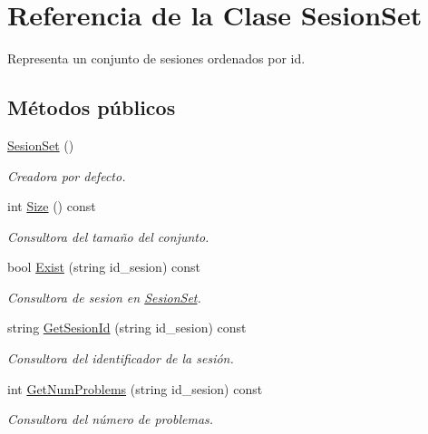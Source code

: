 \hypertarget{class_sesion_set}{}\section{Referencia de la Clase Sesion\+Set}
\label{class_sesion_set}


Representa un conjunto de sesiones ordenados por id.  


\subsection*{Métodos públicos}
\begin{DoxyCompactItemize}
\item 
\mbox{\hyperlink{class_sesion_set_af583057121150fb193e71ae02e036bb0}{Sesion\+Set}} ()
\begin{DoxyCompactList}\small\item\em Creadora por defecto. \end{DoxyCompactList}\item 
int \mbox{\hyperlink{class_sesion_set_aa4cf0fbea2b9f9b6322390fc8b4a1b4c}{Size}} () const
\begin{DoxyCompactList}\small\item\em Consultora del tamaño del conjunto. \end{DoxyCompactList}\item 
bool \mbox{\hyperlink{class_sesion_set_a4e9002494d6532d3cdbd31172b8a08b0}{Exist}} (string id\+\_\+sesion) const
\begin{DoxyCompactList}\small\item\em Consultora de sesion en \mbox{\hyperlink{class_sesion_set}{Sesion\+Set}}. \end{DoxyCompactList}\item 
string \mbox{\hyperlink{class_sesion_set_a0c84ef607240e540fd1bcaec68280636}{Get\+Sesion\+Id}} (string id\+\_\+sesion) const
\begin{DoxyCompactList}\small\item\em Consultora del identificador de la sesión. \end{DoxyCompactList}\item 
int \mbox{\hyperlink{class_sesion_set_afeb85dad709e3fc5717e93c05a24bf8f}{Get\+Num\+Problems}} (string id\+\_\+sesion) const
\begin{DoxyCompactList}\small\item\em Consultora del número de problemas. \end{DoxyCompactList}\item 

\end{DoxyCompactItemize}
